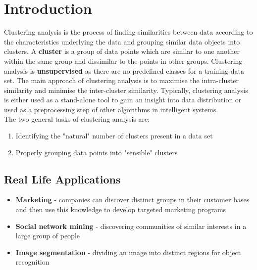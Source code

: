 \documentclass[11pt,fleqn]{book} %
\begin{document}
\section*{Introduction}
Clustering analysis is the process of finding similarities between data according to the characteristics underlying the data and grouping similar data objects into clusters. A \textbf{cluster} is a group of data points which are similar to one another within the same group and dissimilar to the points in other groups. Clustering analysis is \textbf{unsupervised} as there are no predefined classes for a training data set. The main approach of clustering analysis is to maximise the intra-cluster similarity and minimise the inter-cluster similarity. Typically, clustering analysis is either used as a stand-alone tool to gain an insight into data distribution or used as a preprocessing step of other algorithms in intelligent systems.\\

\noindent
The two general tasks of clustering analysis are:
\begin{enumerate}
	\item Identifying the "natural" number of clusters present in a data set
	\item Properly grouping data points into "sensible" clusters
\end{enumerate}

\subsection*{Real Life Applications}
\begin{itemize}
	\item \textbf{Marketing} - companies can discover distinct groups in their customer bases and then use this knowledge to develop targeted marketing programs
	\item \textbf{Social network mining} - discovering communities of similar interests in a large group of people
	\item \textbf{Image segmentation} - dividing an image into distinct regions for object recognition
\end{itemize}
\end{document}
